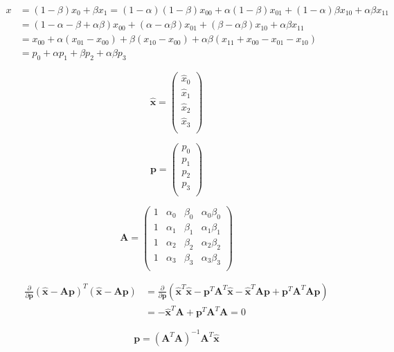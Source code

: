 \documentclass[a4paper,10pt,pdftex]{article}
\begin{document}
\begin{equation}
  \begin{split}
    x &= (1-\beta)x_0 + \beta x_1 = (1-\alpha)(1-\beta)x_{00} + \alpha(1-\beta) x_{01} + (1-\alpha)\beta x_{10} + \alpha\beta x_{11} \\
    &= (1-\alpha-\beta+\alpha\beta)x_{00} + (\alpha-\alpha\beta) x_{01} + (\beta-\alpha\beta) x_{10} + \alpha\beta x_{11} \\
    &= x_{00} + \alpha(x_{01}-x_{00}) + \beta(x_{10}-x_{00}) + \alpha\beta(x_{11}+x_{00}-x_{01}-x_{10}) \\
    &= p_0 + \alpha p_1 + \beta p_2 + \alpha\beta p_3
  \end{split}
\end{equation}

\begin{equation}
  \mathbf{\hat{x}} = \begin{pmatrix}
    \hat{x}_0 \\
    \hat{x}_1 \\
    \hat{x}_2 \\
    \hat{x}_3 \\
  \end{pmatrix}
\end{equation}

\begin{equation}
  \mathbf{p} = \begin{pmatrix}
    p_0 \\
    p_1 \\
    p_2 \\
    p_3 \\
  \end{pmatrix}
\end{equation}

\begin{equation}
  \mathbf{A} = \begin{pmatrix}
    1 & \alpha_0 & \beta_0 & \alpha_0\beta_0 \\
    1 & \alpha_1 & \beta_1 & \alpha_1\beta_1 \\
    1 & \alpha_2 & \beta_2 & \alpha_2\beta_2 \\
    1 & \alpha_3 & \beta_3 & \alpha_3\beta_3 \\
  \end{pmatrix}
\end{equation}

\begin{equation}
  \begin{split}
    \frac\partial{\partial\mathbf{p}} (\mathbf{\hat{x}}-\mathbf{A}\mathbf{p})^T(\mathbf{\hat{x}}-\mathbf{A}\mathbf{p})
    &= \frac\partial{\partial\mathbf{p}} (\mathbf{\hat{x}}^T\mathbf{\hat{x}}-\mathbf{p}^T\mathbf{A}^T\mathbf{\hat{x}}-\mathbf{\hat{x}}^T\mathbf{A}\mathbf{p}+\mathbf{p}^T\mathbf{A}^T\mathbf{A}\mathbf{p}) \\
    &= -\mathbf{\hat{x}}^T\mathbf{A}+\mathbf{p}^T\mathbf{A}^T\mathbf{A} = 0
  \end{split}
\end{equation}

\begin{equation}
  \mathbf{p} = (\mathbf{A}^T\mathbf{A})^{-1}\mathbf{A}^T\mathbf{\hat{x}}
\end{equation}



\end{document}

